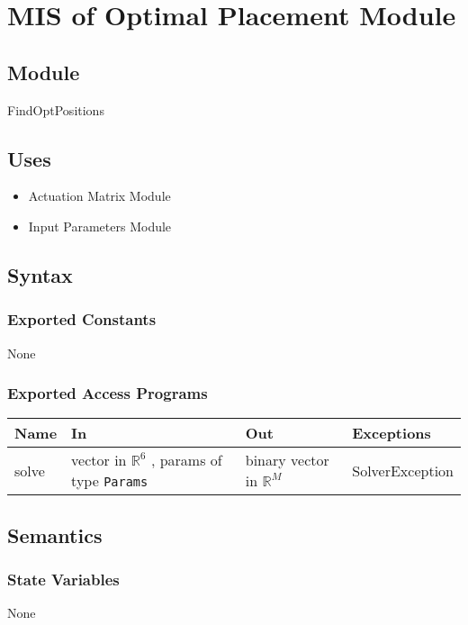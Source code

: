 \documentclass[12pt, titlepage]{article}
\begin{document}
\newpage


\section{MIS of Optimal Placement Module} \label{MISOptPlacement}

\subsection{Module}
FindOptPositions

\subsection{Uses}
\begin{itemize}
  \item Actuation Matrix Module 
  \item Input Parameters Module
\end{itemize}

\subsection{Syntax}

\subsubsection{Exported Constants}
None

\subsubsection{Exported Access Programs}

\begin{center}
  \begin{tabular}{p{3cm} p{4cm} p{4cm} p{3cm}}
  \hline
  \textbf{Name} & \textbf{In} & \textbf{Out} & \textbf{Exceptions} \\
  \hline
  solve & vector in $\mathbb{R}^6$ , params of type \texttt{Params} & binary vector in $\mathbb{R}^M$ & SolverException \\
  \hline
  \end{tabular}
  \end{center}

\subsection{Semantics}

\subsubsection{State Variables}
None
\end{document}
